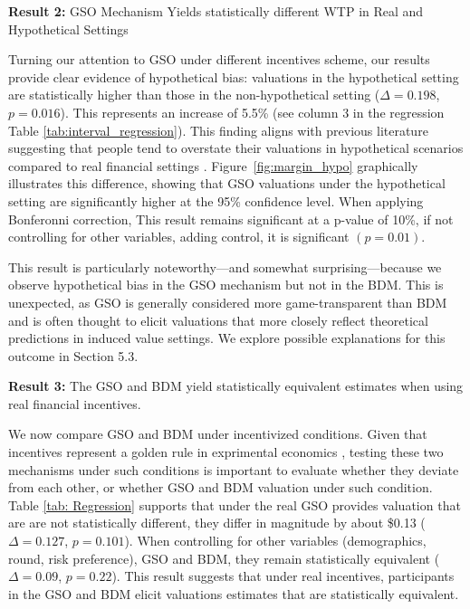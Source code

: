 \documentclass[12pt]{article}
\begin{document}
 
\vspace{0.5cm}

\textbf{Result 2:} GSO Mechanism Yields statistically different WTP in Real and Hypothetical Settings 

Turning our attention to GSO under different incentives scheme, our results provide clear evidence of hypothetical bias: valuations in the hypothetical setting are statistically higher than those in the non-hypothetical setting (\(\Delta = 0.198\), \(p =0.016\)). This represents  an increase of  5.5\% (see column 3 in the regression Table \ref{tab:interval_regression}). This finding aligns with previous literature suggesting that people tend to overstate their valuations in hypothetical scenarios compared to real financial settings \citep{penn2018understanding, fang_use_2021}. Figure~\ref{fig:margin_hypo} graphically illustrates this difference, showing that GSO valuations under the hypothetical setting are significantly higher at the 95\% confidence level. When applying Bonferonni correction, This result remains significant at a p-value of 10\%, if not controlling for other variables, adding control, it is significant \((p = 0.01)\).


This result is particularly noteworthy—and somewhat surprising—because we observe hypothetical bias in the GSO mechanism but not in the BDM. This is unexpected, as GSO is generally considered more game-transparent than BDM and is often thought to elicit valuations that more closely reflect theoretical predictions in induced value settings. We explore possible explanations for this outcome in Section 5.3.

\vspace{0.5cm}



\textbf{Result 3:} The GSO and BDM yield statistically equivalent estimates when using real financial incentives. 

We now compare GSO and BDM under incentivized conditions. Given that incentives represent a golden rule in exprimental economics \citep{smith_experimental_1976}, testing these two mechanisms under such conditions is important to evaluate whether they deviate from each other, or whether GSO and BDM valuation under such condition. Table \ref{tab: Regression} supports that under the real GSO provides valuation that are are not statistically different, they differ in magnitude by about \$0.13 (\(\Delta = 0.127\), \(p = 0.101\)). When controlling for other variables (demographics, round, risk preference), GSO and BDM, they remain statistically equivalent (\(\Delta = 0.09\), \(p = 0.22\)). This result suggests that under real incentives, participants in the GSO and BDM elicit valuations estimates that are statistically equivalent.
\end{document}
